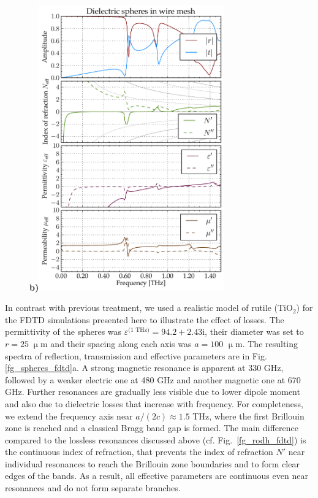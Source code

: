 \documentclass[letterpaper,12pt]{report}
\begin{document}
\begin{figure}[ht]
\textbf{b)}\includegraphics[width=8cm]{img/SphereWire_eps100_R25_FDTD.pdf}
\end{figure}
In contrast with previous treatment, we used a realistic model \cite{baumard1977_epsilon_TiO2} of rutile (TiO$_{2}$) for the FDTD simulations presented here to illustrate the effect of losses. The permittivity of the spheres was $\varepsilon^{\text{(1 THz)}} = 94.2+2.43\text{i}$, their diameter was set to $r=25\;\upmu$m  and their spacing along each axis was $a =100$ $\upmu$m. The resulting spectra of reflection, transmission and effective parameters are in Fig. \ref{fg_spheres_fdtd}a. A strong magnetic resonance is apparent at 330 GHz, followed by a weaker electric one at 480 GHz and another magnetic one at 670 GHz. Further resonances are gradually less visible due to lower dipole moment and also due to dielectric losses that increase with frequency. 
For completeness, we extend the frequency axis near $a/(2c) \approx 1.5$ THz, where the first Brillouin zone is reached and a classical Bragg band gap is formed.
The main difference compared to the lossless resonances discussed above (cf. Fig.~\ref{fg_rodh_fdtd}) is the continuous index of refraction, that prevents the index of refraction $N'$ near individual resonances to reach the Brillouin zone boundaries and to form clear edges of the bands. As a result, all effective parameters are continuous even near resonances and do not form separate branches.
\end{document}

